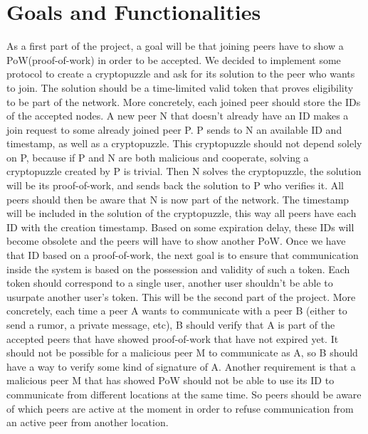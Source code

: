 \documentclass[twocolumn]{article}
\begin{document}
\section{Goals and Functionalities}
As a first part of the project, a goal will be that joining peers have to show a PoW(proof-of-work) in order to be accepted. We decided to implement some protocol to create a cryptopuzzle and ask for its solution to the peer who wants to join. The solution should be a time-limited valid token that proves eligibility to be part of the network.
\linebreak
\linebreak
More concretely, each joined peer should store the IDs of the accepted nodes. A new peer N that doesn’t already have an ID makes a join request to some already joined peer P. P sends to N an available ID and timestamp, as well as a cryptopuzzle. This cryptopuzzle should not depend solely on P, because if P and N are both malicious and cooperate, solving a cryptopuzzle created by P is trivial. Then N solves the cryptopuzzle, the solution will be its proof-of-work, and sends back the solution to P who verifies it. All peers should then be aware that N is now part of the network. The timestamp will be included in the solution of the cryptopuzzle, this way all peers have each ID with the creation timestamp. Based on some expiration delay, these IDs will become obsolete and the peers will have to show another PoW.
\linebreak
\linebreak
Once we have that ID based on a proof-of-work, the next goal is to ensure that communication inside the system  is based on the possession and validity of such a token. Each token should correspond to a single user, another user shouldn’t be able to usurpate another user’s token. This will be the second part of the project.
\linebreak
\linebreak
More concretely, each time a peer A wants to communicate with a peer B (either to send a rumor, a private message, etc), B should verify that A is part of the accepted peers that have showed proof-of-work that have not expired yet. It should not be possible for a malicious peer M to communicate as A, so B should have a way to verify some kind of signature of A. Another requirement is that a malicious peer M that has showed PoW should not be able to use its ID to communicate from different locations at the same time. So peers should be aware of which peers are active at the moment in order to refuse communication from an active peer from another location.
\end{document}
